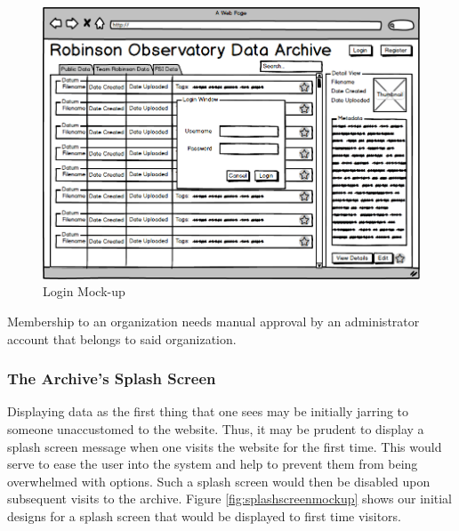 \documentclass[12pt]{report}
\begin{document}
\begin{figure}[h]
	\centering
	\includegraphics[width=\linewidth]{login}
	\caption{Login Mock-up}
	\label{fig:loginmockup}
\end{figure}

Membership to an organization needs manual approval by an administrator account that belongs to said organization.


\subsubsection*{The Archive's Splash Screen}

Displaying data as the first thing that one sees may be initially jarring to someone unaccustomed to the website. Thus, it may be prudent to display a splash screen message when one visits the website for the first time. This would serve to ease the user into the system and help to prevent them from being overwhelmed with options. Such a splash screen would then be disabled upon subsequent visits to the archive. Figure \ref{fig:splashscreenmockup} shows our initial designs for a splash screen that would be displayed to first time visitors.
\end{document}
